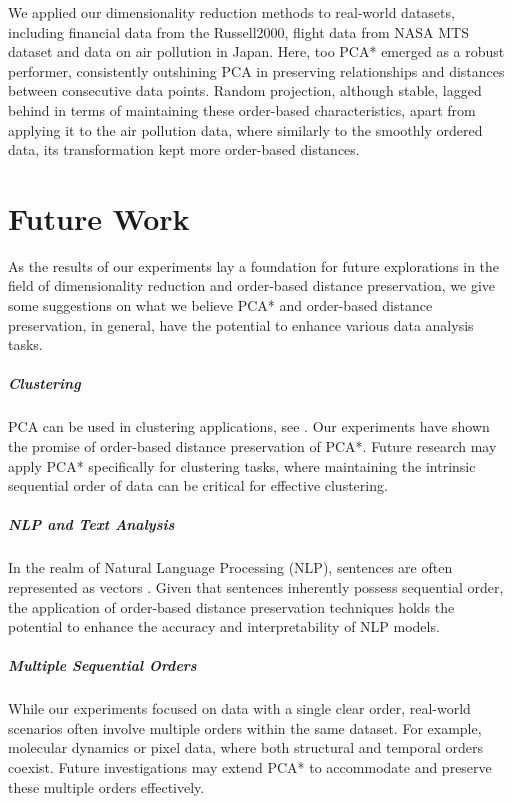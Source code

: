 \documentclass[pdftex,12pt,a4paper]{report}
\begin{document}
We applied our dimensionality reduction methods to real-world datasets, including financial data from the Russell2000, flight data from NASA MTS dataset and data on air pollution in Japan.
Here, too PCA* emerged as a robust performer, consistently outshining PCA in preserving relationships and distances between consecutive data points.
Random projection, although stable, lagged behind in terms of maintaining these order-based characteristics, apart from applying it to the air pollution data, where similarly to the smoothly ordered data, its transformation kept more order-based distances.


\chapter{Future Work} \label{future-work}
As the results of our experiments lay a foundation for future explorations in the field of dimensionality reduction and order-based distance preservation, we give some suggestions on what we believe PCA* and order-based distance preservation, in general, have the potential to enhance various data analysis tasks.

\paragraph*{Clustering}
PCA can be used in clustering applications, see \cite{pca-clustering}.
Our experiments have shown the promise of order-based distance preservation of PCA*. 
Future research may apply PCA* specifically for clustering tasks, where maintaining the intrinsic sequential order of data can be critical for effective clustering.

\paragraph{NLP and Text Analysis}
In the realm of Natural Language Processing (NLP), sentences are often represented as vectors \cite{nlp-sentences}.
Given that sentences inherently possess sequential order, the application of order-based distance preservation techniques holds the potential to enhance the accuracy and interpretability of NLP models.

\paragraph{Multiple Sequential Orders}
While our experiments focused on data with a single clear order, real-world scenarios often involve multiple orders within the same dataset.
For example, molecular dynamics or pixel data, where both structural and temporal orders coexist.
Future investigations may extend PCA* to accommodate and preserve these multiple orders effectively.
\end{document}
